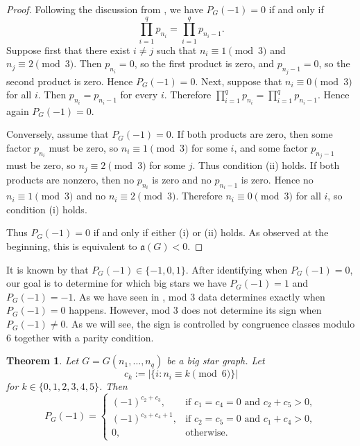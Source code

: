 \documentclass[12pt]{amsart}
\theoremstyle{plain}
\newtheorem{thm}{Theorem}[section]
\theoremstyle{definition}
\begin{document}
\begin{proof}
Following the discussion from , we have $P_G(-1)=0$ if and only if
\[
\prod_{i=1}^q p_{n_i}
=
\prod_{i=1}^q p_{n_i-1}.
\]
Suppose first that there exist $i\neq j$ such that
$n_i\equiv 1\pmod 3$ and $n_j\equiv 2\pmod 3$.
Then $p_{n_i}=0$, so the first product is zero, and
$p_{n_j-1}=0$, so the second product is zero. Hence $P_G(-1)=0$. Next, suppose that $n_i\equiv 0\pmod 3$ for all $i$.
Then $p_{n_i}=p_{n_i-1}$ for every $i$. Therefore \(\prod_{i=1}^q p_{n_i}
=
\prod_{i=1}^q p_{n_i-1}\).
Hence again $P_G(-1)=0$. 


Conversely, assume that $P_G(-1)=0$. If both products are zero, then some factor $p_{n_i}$ must be zero, so
$n_i\equiv 1\pmod 3$ for some $i$, and some factor $p_{n_j-1}$ must be zero, so
$n_j\equiv 2\pmod 3$ for some $j$. Thus condition (ii) holds. If both products are nonzero, then no $p_{n_i}$ is zero and no $p_{n_i-1}$ is zero.
Hence no $n_i\equiv 1\pmod 3$ and no $n_i\equiv 2\pmod 3$.
Therefore $n_i\equiv 0\pmod 3$ for all $i$, so condition (i) holds.

Thus $P_G(-1)=0$ if and only if either (i) or (ii) holds. As observed at the beginning,
this is equivalent to $\mathfrak a(G)<0$.
\end{proof}



It is known by  that  \(P_G(-1)\in\{-1,0,1\}\). After identifying when $P_G(-1)=0$, our goal is to determine for which big stars we have $P_G(-1)=1$ and $P_G(-1)=-1$. As we have seen in ,  mod $3$ data determines exactly when $P_G(-1)=0$ happens.  However, mod $3$ does not determine its sign when $P_G(-1)\neq 0$. As we will see, the sign is controlled by congruence classes modulo  $6$  together with a parity condition.


\begin{thm}\label{thm:big_star_pm1}
Let \(G=G(n_1,\ldots,n_q)\) be a big star graph.  
Let 
\[
c_k:=|\{ i : n_i\equiv k \pmod 6 \}|
\] for \(k\in\{0,1,2,3,4,5\}\). Then
\[
P_G(-1)=
\begin{cases}
(-1)^{c_2+c_3}, & \text{if } c_1=c_4=0 \text{ and } c_2+c_5>0,\\[2mm]
(-1)^{c_3+c_4+1}, & \text{if } c_2=c_5=0 \text{ and } c_1+c_4>0,\\[2mm]
0, & \text{otherwise}.
\end{cases}
\]
\end{thm}
\end{document}

